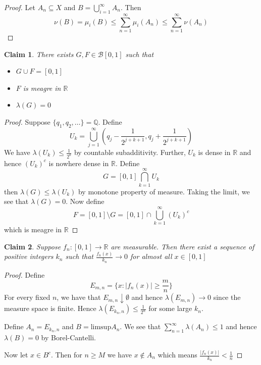 \documentclass[a4paper,11pt]{article}
\newtheorem{claim}{Claim}
\begin{document}
\begin{proof}
  Let $A_n \subseteq X$ and $B=\bigcup_{i=1}^\infty A_n$. Then \[\nu(B)= \mu_i(B) \leq \sum_{n=1}^\infty \mu_i(A_n) \leq \sum_{n=1}^\infty \nu(A_n)\]
\end{proof}

\begin{claim}
  There exists $G,F \in  \mathcal{B}[0,1]$ such that 
  \begin{itemize}
    \item $G \cup F= [0,1]$
    \item $F$ is meagre in $\mathbb{R}$
    \item $\lambda(G)=0$
  \end{itemize}
\end{claim}

\begin{proof}
  Suppose $\{q_1,q_2,\dots\}=\mathbb{Q}$. Define \[U_k=\bigcup_{j=1}^\infty (q_j - \frac{1}{2^{j+k+1}}, q_j + \frac{1}{2^{j+k+1}})\]
  We have $\lambda(U_k) \leq \frac{1}{2^{k}}$ by countable subadditivity. Further, $U_k$ is dense in $\mathbb{R}$ and hence $(U_k)^c$ is nowhere dense in $\mathbb{R}$.
  Define \[G=[0,1] \bigcap_{k=1}^\infty U_k\] then $\lambda(G)\leq \lambda(U_k)$ by monotone property of measure. 
  Taking the limit, we see that $\lambda(G)=0$. Now define \[F = [0,1] \setminus G = [0,1] \cap \bigcup_{k=1}^\infty (U_k)^c\] 
  which is meagre in $\mathbb{R}$
\end{proof}

\begin{claim}
  Suppose $f_n:[0,1] \to \mathbb{R}$ are measurable. 
  Then there exist a sequence of positive integers $k_n$ 
  such that $\frac{f_n(x)}{k_n} \to 0$ for almost all $x \in [0,1]$
\end{claim}

\begin{proof}
  Define \[E_{m,n}=\{x:|f_n(x)| \geq \frac{m}{n}\}\]
  For every fixed $n$, we have that $E_{m,n} \downarrow \emptyset$ 
  and hence $\lambda (E_{m,n}) \to 0$ since the measure space is finite. Hence $\lambda(E_{k_n,n}) \leq \frac{1}{2^n}$ for some large $k_n$.
  
  Define $A_n=E_{k_n,n}$ and $B=\text{limsup}A_n$. We see that $\sum_{n=1}^\infty \lambda(A_n) \leq 1$ and hence $\lambda(B)=0$ by Borel-Cantelli.
  
  Now let $x \in B^c$. Then for $n \geq M$ we have $x \notin A_n$ which means $\frac{|f_n(x)|}{k_n}<\frac{1}{n}$ 
\end{proof}
\end{document}
